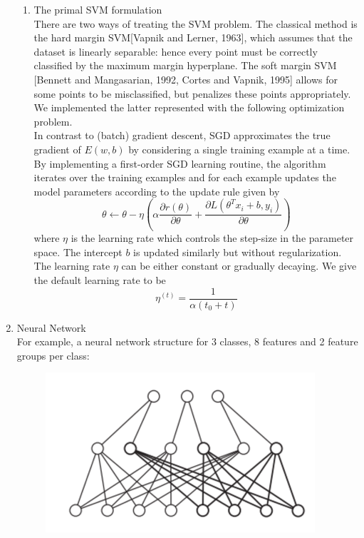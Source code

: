 \documentclass [a4paper, 11pt, oneside, final]{article}
\numberwithin{equation}{section}		%
\numberwithin{figure}{section}			%
\numberwithin{table}{section}				%
\begin{document}
\begin{enumerate}
\begin{enumerate}
\item The primal SVM formulation\\
There are two ways of treating the SVM problem. The classical method is the hard margin SVM[Vapnik and Lerner, 1963], which assumes that the dataset is linearly separable: hence every point must be correctly classified by the maximum margin hyperplane. The soft margin SVM [Bennett and Mangasarian, 1992, Cortes and Vapnik, 1995] allows for some points to be misclassified, but penalizes these points appropriately. We implemented the latter represented with the following optimization problem.\\
In contrast to (batch) gradient descent, SGD approximates the true gradient of $E(w, b)$ by considering a single training example at a time.\\
By implementing a first-order SGD learning routine, the algorithm iterates over the training examples and for each example updates the model parameters according to the update rule given by $$\theta \leftarrow \theta - \eta(\alpha \frac{\partial r(\theta)}{\partial \theta} + \frac{\partial L(\theta^Tx_{i} + b, y_{i})}{\partial \theta})  $$ 
where $\eta$ is the learning rate which controls the step-size in the parameter space. The intercept $b$ is updated similarly but without regularization.\\
The learning rate $\eta$ can be either constant or gradually decaying. We give the default learning rate to be 
$$ \eta^{(t)} = \frac{1}{\alpha(t_{0} + t)}$$

\end{enumerate}

\item Neural Network  \\
For example, a neural network structure for 3 classes, 8 features and 2 feature groups per class:
\begin{figure}[h]
\includegraphics[width = 10cm]{nn}
\end{figure}			        



\end{enumerate}
\end{document}
